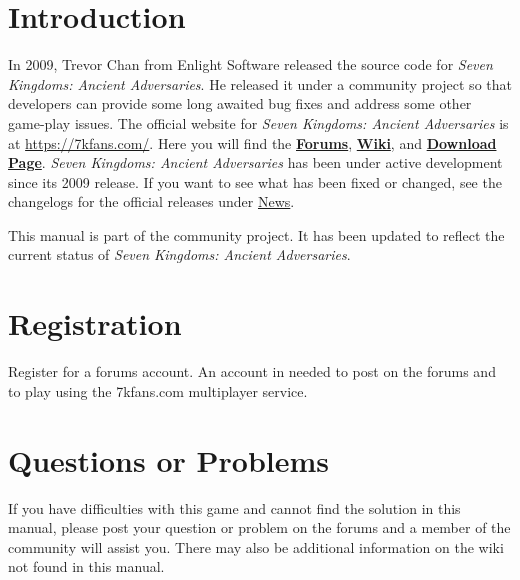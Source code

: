 \documentclass[openany,a4paper,12pt]{book}
\begin{document}
\section{Introduction}
In 2009, Trevor Chan from Enlight Software released the source code for \textit{Seven Kingdoms: Ancient Adversaries}. He released it under a community project so that developers can provide some long awaited bug fixes and address some other game-play issues. The official website for \textit{Seven Kingdoms: Ancient Adversaries} is at \href{<https://7kfans.com/>}{https://7kfans.com/}. Here you will find the \href{<https://www.7kfans.com/forums/>}{\textbf{Forums}}, \href{<https://www.7kfans.com/wiki/index.php/Main_Page>}{\textbf{Wiki}}, and \href{<https://www.7kfans.com/wiki/index.php/Download>}{\textbf{Download Page}}. \textit{Seven Kingdoms: Ancient Adversaries} has been under active development since its 2009 release. If you want to see what has been fixed or changed, see the changelogs for the official releases under \href{<https://7kfans.com/>}{News}. 

This manual is part of the community project. It has been updated to reflect the current status of \textit{Seven Kingdoms: Ancient Adversaries}.

\section{Registration}

Register for a forums account. An account in needed to post on the forums and to play using the 7kfans.com multiplayer service.

\section{Questions or Problems}

If you have difficulties with this game and cannot find the solution in this manual, please post your question or problem on the forums and a member of the community will assist you. There may also be additional information on the wiki not found in this manual.

\tableofcontents

\mainmatter


























\backmatter

\printindex
\end{document}
